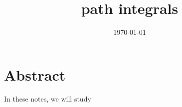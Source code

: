 \documentclass[a4paper, 12pt]{memoir}
\title{path integrals}
\date{\today}
\begin{document}
\frontmatter



\tableofcontents

\mainmatter



\chapter*{Abstract}

    In these notes, we will study 



\backmatter

\nocite{rqmlecture2}

\clearpage
{}
\printbibliography
\end{document}
